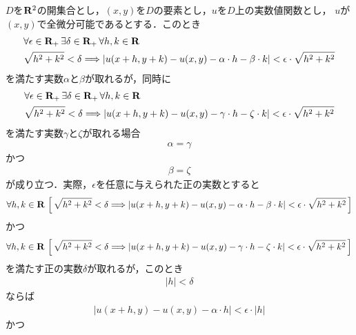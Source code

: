 	$D$を$\mathbf{R}^2$の開集合とし，$(x,y)$を$D$の要素とし，$u$を$D$上の実数値関数とし，
	$u$が$(x,y)$で全微分可能であるとする．このとき
	\begin{align}
		&\forall \epsilon \in \mathbf{R}_+\, \exists \delta \in \mathbf{R}_+\, \forall h,k \in \mathbf{R}\, \\
		&\sqrt{h^2 + k^2} < \delta \Longrightarrow
		\left|u(x+h,y+k) - u(x,y) - \alpha \cdot h - \beta \cdot k\right| 
		< \epsilon \cdot \sqrt{h^2 + k^2}
	\end{align}
	を満たす実数$\alpha$と$\beta$が取れるが，同時に
	\begin{align}
		&\forall \epsilon \in \mathbf{R}_+\, \exists \delta \in \mathbf{R}_+\, \forall h,k \in \mathbf{R}\, \\
		&\sqrt{h^2 + k^2} < \delta \Longrightarrow
		\left|u(x+h,y+k) - u(x,y) - \gamma \cdot h - \zeta \cdot k\right| 
		< \epsilon \cdot \sqrt{h^2 + k^2}
	\end{align}
	を満たす実数$\gamma$と$\zeta$が取れる場合
	\begin{align}
		\alpha = \gamma
	\end{align}
	かつ
	\begin{align}
		\beta = \zeta
	\end{align}
	が成り立つ．実際，$\epsilon$を任意に与えられた正の実数とすると
	\begin{align}
		\forall h,k \in \mathbf{R}\,
		\left[\, \sqrt{h^2 + k^2} < \delta \Longrightarrow
		\left|u(x+h,y+k) - u(x,y) - \alpha \cdot h - \beta \cdot k\right| 
		< \epsilon \cdot \sqrt{h^2 + k^2}\, \right]
	\end{align}
	かつ
	\begin{align}
		\forall h,k \in \mathbf{R}\,
		\left[\, \sqrt{h^2 + k^2} < \delta \Longrightarrow
		\left|u(x+h,y+k) - u(x,y) - \gamma \cdot h - \zeta \cdot k\right| 
		< \epsilon \cdot \sqrt{h^2 + k^2}\, \right]
	\end{align}
	を満たす正の実数$\delta$が取れるが，このとき
	\begin{align}
		|h| < \delta
	\end{align}
	ならば
	\begin{align}
		\left|u(x+h,y) - u(x,y) - \alpha \cdot h\right| < \epsilon \cdot |h|
	\end{align}
	かつ
	
	\begin{screen}
		\begin{thm}[全微分可能なら偏微分可能]
		\end{thm}
	\end{screen}
	
	\begin{screen}
		\begin{thm}[偏導関数が連続なら全微分可能]
		\end{thm}
	\end{screen}

